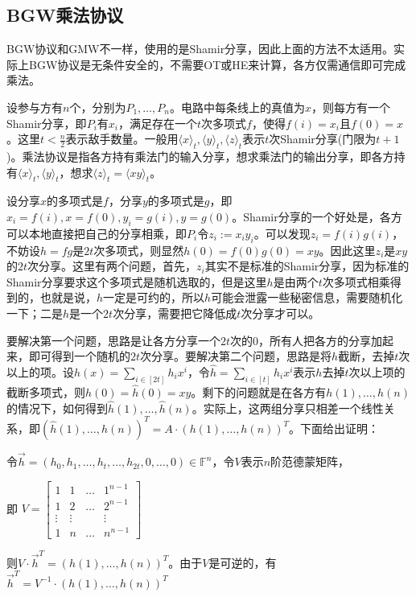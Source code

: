 \documentclass[UTF8]{ctexart}
\theoremstyle{nonumberplain}
\theoremstyle{plain}
\begin{document}
\subsection{BGW乘法协议}
BGW协议和GMW不一样，使用的是Shamir分享，因此上面的方法不太适用。实际上BGW协议是无条件安全的，不需要OT或HE来计算，各方仅需通信即可完成乘法。

设参与方有$n$个，分别为$P_1,\dots, P_n$。电路中每条线上的真值为$x$，则每方有一个Shamir分享，即$P_i$有$x_i$，满足存在一个$t$次多项式$f$，使得$f(i)=x_i$且$f(0)=x$。这里$t<\frac{n}{2}$表示敌手数量。一般用$\langle x\rangle_t,\langle y\rangle_t,\langle z\rangle_t$表示$t$次Shamir分享(门限为$t+1$)。乘法协议是指各方持有乘法门的输入分享，想求乘法门的输出分享，即各方持有$\langle x\rangle_t,\langle y\rangle_t$，想求$\langle z\rangle_t=\langle xy\rangle_t$。

设分享$x$的多项式是$f$，分享$y$的多项式是$g$，即$x_i=f(i),x=f(0),y_i=g(i),y=g(0)$。Shamir分享的一个好处是，各方可以本地直接把自己的分享相乘，即$P_i$令$z_i:=x_iy_i$。可以发现$z_i = f(i)g(i)$，不妨设$h=fg$是$2t$次多项式，则显然$h(0)=f(0)g(0)=xy$。因此这里$z_i$是$xy$的$2t$次分享。这里有两个问题，首先，$z_i$其实不是标准的Shamir分享，因为标准的Shamir分享要求这个多项式是随机选取的，但是这里$h$是由两个$t$次多项式相乘得到的，也就是说，$h$一定是可约的，所以$h$可能会泄露一些秘密信息，需要随机化一下；二是$h$是一个$2t$次分享，需要把它降低成$t$次分享才可以。

要解决第一个问题，思路是让各方分享一个$2t$次的0，所有人把各方的分享加起来，即可得到一个随机的$2t$次分享。要解决第二个问题，思路是将$h$截断，去掉$t$次以上的项。设$h(x)=\sum_{i\in[2t]}h_ix^i$，令$\hat{h}=\sum_{i\in [t]}h_ix^i$表示$h$去掉$t$次以上项的截断多项式，则$h(0)=\hat{h}(0)=xy$。剩下的问题就是在各方有$h(1),\dots,h(n)$的情况下，如何得到$\hat{h}(1),\dots,\hat{h}(n)$。实际上，这两组分享只相差一个线性关系，即$(\hat{h}(1),\dots,\hat{h}(n))^T=A\cdot (h(1),\dots,h(n))^T$。下面给出证明：

令$\vec{h}=(h_0,h_1,\dots,h_t,\dots,h_{2t},0,\dots,0)\in \mathbb{F}^n$，令$V$表示$n$阶范德蒙矩阵，

即 { $V=\left[ \begin{array}{cccc}
	     1&1&\dots&1^{n-1}  \\
	     1&2&\dots&2^{n-1}  \\
	     \vdots&\vdots&&\vdots  \\
	     1&n&\dots&n^{n-1}  
		\end{array}
		\right ]$}

则$V\cdot \vec{h}^T=(h(1),\dots,h(n))^T$。由于$V$是可逆的，有$\vec{h}^T=V^{-1}\cdot (h(1),\dots,h(n))^T$
\end{document}
